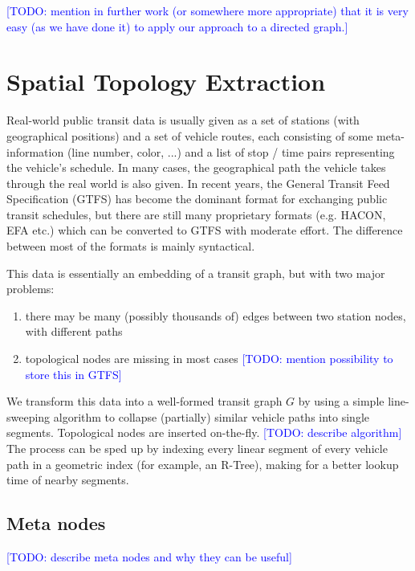\documentclass{llncs}
\newcommand\todo[1]{\textcolor{blue}{[TODO: #1]}}
\begin{document}
\todo{mention in further work (or somewhere more appropriate) that it is very easy (as we have done it) to apply our approach to a directed graph.}

%
\section{Spatial Topology Extraction}\label{SEC:topo}
%

Real-world public transit data is usually given as a set of stations (with geographical positions) and a set of vehicle routes, each consisting of some meta-information (line number, color, ...) and a list of stop / time pairs representing the vehicle's schedule. In many cases, the geographical path the vehicle takes through the real world is also given. In recent years, the General Transit Feed Specification (GTFS) has become the dominant format for exchanging public transit schedules, but there are still many proprietary formats (e.g. HACON, EFA etc.) which can be converted to GTFS with moderate effort. The difference between most of the formats is mainly syntactical.

This data is essentially an embedding of a transit graph, but with two major problems:
\begin{enumerate}
	\item there may be many (possibly thousands of) edges between two station nodes, with different paths
	\item topological nodes are missing in most cases \todo{mention possibility to store this in GTFS}
\end{enumerate}

We transform this data into a well-formed transit graph $G$ by using a simple line-sweeping algorithm to collapse (partially) similar vehicle paths into single segments. Topological nodes are inserted on-the-fly.
\todo{describe algorithm}
% 
The process can be sped up by indexing every linear segment of every vehicle path in a geometric index (for example, an R-Tree), making for a better lookup time of nearby segments.

%
\subsection{Meta nodes}\label{SEC:metanodes}
%
\todo{describe meta nodes and why they can be useful}
\end{document}
